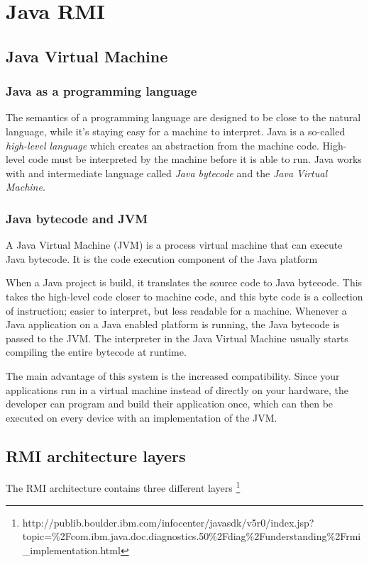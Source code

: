 \section{Java RMI}
\subsection{Java Virtual Machine}
\subsubsection{Java as a programming language}
The semantics of a programming language are designed to be close to the natural language, while it's staying easy for a machine to interpret. Java is a so-called \emph{high-level language} which creates an abstraction from the machine code. High-level code must be interpreted by the machine before it is able to run. Java works with and intermediate language called \emph{Java bytecode} and the \emph{Java Virtual Machine}.

\subsubsection{Java bytecode and JVM}
A Java Virtual Machine (JVM) is a process virtual machine that can execute Java bytecode. It is the code execution component of the Java platform

When a Java project is build, it translates the source code to Java bytecode. This takes the high-level code closer to machine code, and this byte code is a collection of instruction; easier to interpret, but less readable for a machine. Whenever a Java application on a Java enabled platform is running, the Java bytecode is passed to the JVM. The interpreter in the Java Virtual Machine usually starts compiling the entire bytecode at runtime.

The main advantage of this system is the increased compatibility. Since your applications run in a virtual machine instead of directly on your hardware, the developer can program and build their application once, which can then be executed on every device with an implementation of the JVM.

\subsection{RMI architecture layers}
The RMI architecture contains three different layers \footnote{http://publib.boulder.ibm.com/infocenter/javasdk/v5r0/index.jsp?\\topic=\%2Fcom.ibm.java.doc.diagnostics.50\%2Fdiag\%2Funderstanding\%2Frmi\_implementation.html}

